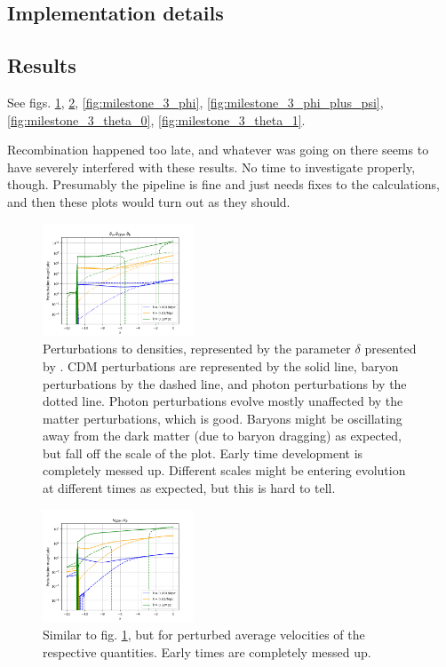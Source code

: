\subsection{Implementation details}

\subsection{Results}
See figs. \ref{fig:milestone_3_delta_gamma_delta_b_delta_cdm}, \ref{fig:milestone_3_v_b_v_cdm}, \ref{fig:milestone_3_phi}, \ref{fig:milestone_3_phi_plus_psi}, \ref{fig:milestone_3_theta_0}, \ref{fig:milestone_3_theta_1}.

Recombination happened too late, and whatever was going on there seems to have severely interfered with these results. No time to investigate properly, though. Presumably the pipeline is fine and just needs fixes to the calculations, and then these plots would turn out as they should.

\begin{figure}[h!tbp]
\centering
\includegraphics[width=0.4\textwidth]{../Milestone 3/Plots/delta_gamma_delta_b_delta_cdm_plot.png}
\caption{Perturbations to densities, represented by the parameter $\delta$ presented by \citet{wintherCosmologyIILecture2024}. CDM perturbations are represented by the solid line, baryon perturbations by the dashed line, and photon perturbations by the dotted line. Photon perturbations evolve mostly unaffected by the matter perturbations, which is good. Baryons might be oscillating away from the dark matter (due to baryon dragging) as expected, but fall off the scale of the plot. Early time development is completely messed up. Different scales might be entering evolution at different times as expected, but this is hard to tell.}
\label{fig:milestone_3_delta_gamma_delta_b_delta_cdm}
\end{figure}

\begin{figure}[h!tbp]
\centering
\includegraphics[width=0.4\textwidth]{../Milestone 3/Plots/v_b_v_cdm_plot.png}
\caption{Similar to fig. \ref{fig:milestone_3_delta_gamma_delta_b_delta_cdm}, but for perturbed average velocities of the respective quantities. Early times are completely messed up.}
\label{fig:milestone_3_v_b_v_cdm}
\end{figure}

